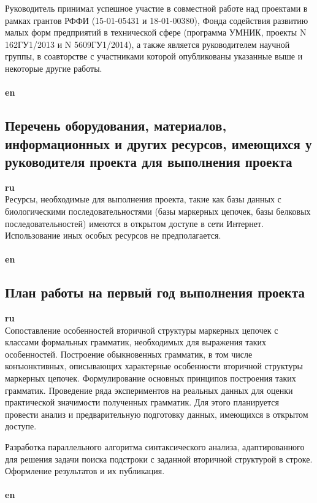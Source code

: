 \documentclass[12pt]{article}  %
\theoremstyle{remark}
\begin{document}
Руководитель принимал успешное участие в совместной работе над проектами в рамках грантов РФФИ (15-01-05431 и 18-01-00380), Фонда содействия развитию малых форм предприятий в технической сфере
(программа УМНИК, проекты N 162ГУ1/2013 и N 5609ГУ1/2014), а также является руководителем научной группы, в соавторстве с участниками которой опубликованы указанные выше и некоторые другие работы.
\\
\\
\textbf{en}\\

\subsection{Перечень оборудования, материалов, информационных и других ресурсов, имеющихся у руководителя проекта для выполнения проекта }
\textbf{ru}\\
Ресурсы, необходимые для выполнения проекта, такие как базы данных с биологическими последовательностями (базы маркерных цепочек, базы белковых последовательностей) имеются в открытом доступе в сети Интернет.
Использование иных особых ресурсов не предполагается.
\\
\\
\textbf{en}\\


\subsection{План работы на первый год выполнения проекта}

\textbf{ru}\\
Сопоставление особенностей вторичной структуры маркерных цепочек с классами формальных грамматик, необходимых для выражения таких особенностей. Построение обыкновенных грамматик, в том числе конъюнктивных, описывающих характерные особенности вторичной структуры маркерных цепочек.
Формулирование основных принципов построения таких грамматик.
Проведение ряда экспериментов на реальных данных для оценки практической значимости полученных грамматик. Для этого планируется провести анализ и предварительную подготовку данных, имеющихся в открытом доступе.

Разработка параллельного алгоритма синтаксического анализа, адаптированного для решения задачи поиска подстроки с заданной вторичной структурой в строке.
Оформление результатов и их публикация.
\\
\\
\textbf{en}\\
\end{document}
